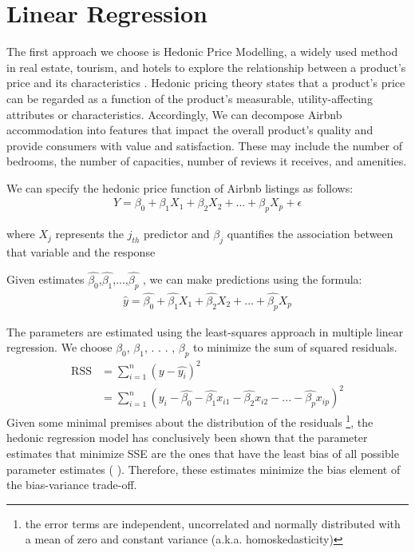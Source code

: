 

\section{Linear Regression}
\label{sec:linear-regression}

The first approach we choose is Hedonic Price Modelling, a widely used method in
real estate, tourism, and hotels to explore the relationship between a product's
price and its characteristics \parencite{rosen1974hedonic}.  Hedonic pricing
theory states that a product's price can be regarded as a function of the
product's measurable, utility-affecting attributes or characteristics.
Accordingly, We can decompose Airbnb accommodation into features that impact the
overall product's quality and provide consumers with value and satisfaction.
These may include the number of bedrooms, the number of capacities, number of
reviews it receives, and amenities.

We can specify the hedonic price function of Airbnb listings as follows:
\begin{eqnarray}
    Y = \beta_0 + \beta_1 X_1 + \beta_2 X_2 + ... + \beta_p X_p + \epsilon
\end{eqnarray}

where $X_j$ represents the $j_{th}$ predictor and $\beta_j$ quantifies the
association between that variable and the response

Given estimates $\hat{\beta_0}$,$\hat{\beta_1}$,...,$\hat{\beta_p}$ , we can
make predictions using the formula:
\begin{eqnarray}
  \hat{y} = \hat{\beta_0} + \hat{\beta_1} X_1 + \hat{\beta_2} X_2 + ... + \hat{\beta_p} X_p
\end{eqnarray}

The parameters are estimated using the least-squares approach in multiple linear
regression. We choose $\beta_0$, $\beta_1$, . . . , $\beta_p$ to minimize the
sum of squared residuals.
\begin{equation}
\begin{split}
\textrm{RSS} & = \sum_{i=1}^{n}(y-\hat{y_i})^2 \\
   & =\sum_{i=1}^{n}(y_i - \hat{\beta_0} - \hat{\beta_1} x_{i1} - \hat{\beta_2} x_{i2} - ... - \hat{\beta_p} x_{ip})^2
\end{split}
\end{equation}
Given some minimal premises about the distribution of the residuals \footnote{
the error terms are independent, uncorrelated and normally distributed with a
mean of zero and constant variance  (a.k.a. homoskedasticity)}, the hedonic
regression model has conclusively been shown that the parameter estimates that
minimize SSE are the ones that have the least bias of all possible parameter
estimates (\textcite{graybill1976theory} ). Therefore, these estimates minimize
the bias element of the bias-variance trade-off.

